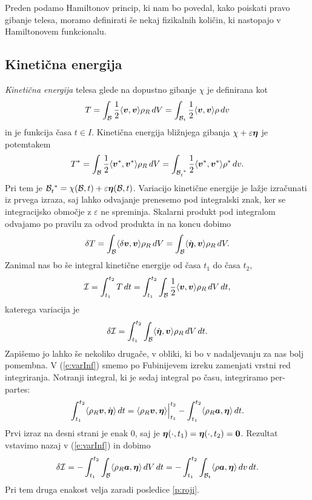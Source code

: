 Preden podamo Hamiltonov princip, ki nam bo povedal, kako poiskati pravo gibanje telesa,
moramo definirati še nekaj fizikalnih količin, ki nastopajo v Hamiltonovem funkcionalu.


\subsection{Kinetična energija}


\emph{Kinetična energija} telesa glede na dopustno gibanje $\chi$ je definirana kot
\begin{equation*}
	T = \int_{\mathcal B}\frac{1}{2}\langle\boldsymbol v,\boldsymbol v\rangle\rho_R\, dV =
	\int_{\mathcal B_t}\frac{1}{2}\langle\boldsymbol v,\boldsymbol v\rangle\rho\, dv
\end{equation*}
in je funkcija časa $t\in I$. Kinetična energija bližnjega gibanja $\chi+\varepsilon\boldsymbol \eta$
je potemtakem
\begin{equation*}
	T^* = \int_{\B}\frac{1}{2}\langle\vek{v}^*,\vek{v}^*\rangle\rho_R\, dV =
	\int_{\bottop{\B}{t}{*}}\frac{1}{2}\langle\vek{v}^*,\vek{v}^*\rangle\rho^*\, dv.
\end{equation*}
Pri tem je $\bottop{\B}{t}{*}=\chi(\B,t)+\varepsilon\vek{\eta}(\B,t)$.
Variacijo kinetične energije je lažje izračunati iz prvega izraza, saj lahko odvajanje prenesemo pod
integralski znak, ker se integracijsko območje z $\varepsilon$ ne spreminja. Skalarni produkt pod integralom
odvajamo po pravilu za odvod produkta in na koncu dobimo
\[
	\delta T =
	\int_{\mathcal B}\langle\delta\boldsymbol v,\boldsymbol v\rangle\rho_R\, dV=
	\int_{\mathcal B}\langle\dot{\boldsymbol \eta},\boldsymbol v\rangle\rho_R\, dV.
\]
Zanimal nas bo še integral kinetične energije od časa $t_1$ do časa $t_2$,
\[
	\mathcal{I}=\int_{t_1}^{t_2} T\,dt=\int_{t_1}^{t_2}
	\int_{\mathcal B}\frac{1}{2}\langle\boldsymbol v,\boldsymbol v\rangle\rho_R\, dV \,dt,
\]
katerega variacija je
\begin{equation}\label{e:varInf}
	\delta \mathcal{I}=\int_{t_1}^{t_2}\int_{\mathcal B}\langle\dot{\boldsymbol \eta},\boldsymbol v\rangle\rho_R\, dV\, dt.
\end{equation}
Zapišemo jo lahko še nekoliko drugače, v obliki, ki bo v nadaljevanju za nas bolj pomembna.
V (\ref{e:varInf}) smemo po Fubinijevem izreku zamenjati vrstni red integriranja.
Notranji integral, ki je sedaj integral po času, integriramo per-partes:
\[
	\int_{t_1}^{t_2}\langle\rho_R\boldsymbol v,\dot{\boldsymbol \eta}\rangle\, dt =
	\langle\rho_R\boldsymbol v,\boldsymbol \eta\rangle\Big|_{t_1}^{t_2}-
	\int_{t_1}^{t_2}\langle\rho_R\boldsymbol a,\boldsymbol \eta\rangle\,dt.
\]
Prvi izraz na desni strani je enak 0, saj je $\boldsymbol \eta(\cdot,t_1)=\boldsymbol \eta(\cdot,t_2)=\boldsymbol 0$.
Rezultat vstavimo nazaj v (\ref{e:varInf}) in dobimo
\begin{equation}\label{e:varkin}
	\delta \mathcal{I} =
	-\int_{t_1}^{t_2}\int_{\mathcal B}\langle\rho_R\boldsymbol a,\boldsymbol \eta\rangle\, dV\, dt=
	-\int_{t_1}^{t_2}\int_{\mathcal B_t}\langle\rho\boldsymbol a,\boldsymbol \eta\rangle\, dv\, dt.
\end{equation}
Pri tem druga enakost velja zaradi posledice \ref{p:roji}.


